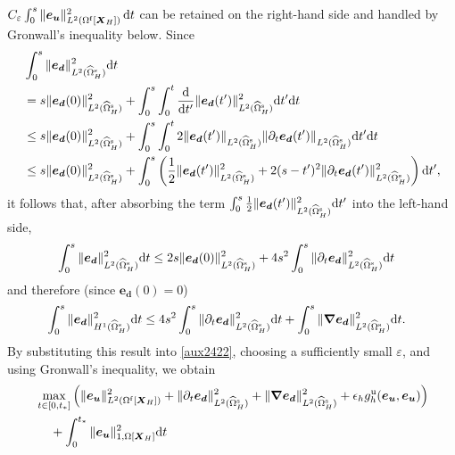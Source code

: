\documentclass[11pt,reqno]{amsart}
\theoremstyle{definition}
\theoremstyle{plain}
\numberwithin{theorem}{section}
\numberwithin{proposition}{section}
\numberwithin{lemma}{section}
\numberwithin{equation}{section}
\newcommand{\bs}[1]{\boldsymbol{#1}}
\newcommand{\uu}[1]  {{\bs{#1}} }
\newcommand{\dep}{{{\bs{d}}}}
\newcommand{\grad}   { \uu{\nabla}    }
\def\d{\mathrm{d}}
\renewcommand{\(}{\bigl(}
\renewcommand{\)}{\bigr)}
\begin{document}
\begin{itemize}[leftmargin=20pt]
$C_\varepsilon\int_0^s\|{\bs e}_{\bs u}\|_{L^2(\Omega^{\rm f}[{\bs X}_H])}^2\,\d t$
can be retained on the right-hand side and handled by Gronwall's inequality below. Since
\begin{align*}
&\int_0^s \|{\bs e}_{\bs d}\|_{L^2(\widehat{\Omega}^{\rm s}_H)}^2 \d t \notag\\
&= s\|{\bs e}_{\bs d}(0)\|_{L^2(\widehat{\Omega}^{\rm s}_H)}^2
+ \int_0^s \int_0^t\frac{\d}{\d t'}\|{\bs e}_{\bs d}(t')\|_{L^2(\widehat{\Omega}^{\rm s}_H)}^2 \d t'\d t  \notag\\
&\le  s\|{\bs e}_{\bs d}(0)\|_{L^2(\widehat{\Omega}^{\rm s}_H)}^2
+ \int_0^s \int_0^t2\|{\bs e}_{\bs d}(t')\|_{L^2(\widehat{\Omega}^{\rm s}_H)}
\|\partial_t{\bs e}_{\bs d}(t')\|_{L^2(\widehat{\Omega}^{\rm s}_H)}  \d t'\d t\notag\\
&\le  s\|{\bs e}_{\bs d}(0)\|_{L^2(\widehat{\Omega}^{\rm s}_H)}^2
+ \int_0^s \left(\frac12\|{\bs e}_{\bs d}(t')\|_{L^2(\widehat{\Omega}^{\rm s}_H)}^2+
2(s-t')^2\|\partial_t{\bs e}_{\bs d}(t')\|_{L^2(\widehat{\Omega}^{\rm s}_H)}^2\right)\d t' , 
\end{align*}
it follows that, after absorbing the term $\int_0^s\frac12\|{\bs e}_{\bs d}(t')\|_{L^2(\widehat{\Omega}^{\rm s}_H)}^2\d t'$ into the left-hand side, 
\begin{align*}
&\int_0^s \|{\bs e}_{\bs d}\|_{L^2(\widehat{\Omega}^{\rm s}_H)}^2 \d t 
\le 2s\|{\bs e}_{\bs d}(0)\|_{L^2(\widehat{\Omega}^{\rm s}_H)}^2
+ 4s^2\int_0^s \|\partial_t{\bs e}_{\bs d}\|_{L^2(\widehat{\Omega}^{\rm s}_H)}^2 \d t 
\end{align*}
and therefore (since ${\bs e}_{\bs d}(0)=0$) 
\begin{align*}
&\int_0^s \|{\bs e}_{\bs d}\|_{H^1(\widehat{\Omega}^{\rm s}_H)}^2 \d t 
\le 4s^2\int_0^s \|\partial_t{\bs e}_{\bs d}\|_{L^2(\widehat{\Omega}^{\rm s}_H)}^2 \d t
+ \int_0^s \|\grad{\bs e}_{\bs d}\|_{L^2(\widehat{\Omega}^{\rm s}_H)}^2 \d t .
\end{align*}
By substituting this result into \eqref{aux2422}, choosing a sufficiently small $\varepsilon$, and using Gronwall's inequality, we obtain 
\begin{align}\label{Bound1}
& \max_{t\in[0,t_*]} \Big(\| {\bs e}_{\bs u} \|_{L^2(\Omega^{\rm f}[\bs X_H])}^2 + \|\partial_t{\bs e}_\dep\|_{L^2(\widehat{\Omega}^{\rm s}_H)}^2 
+ \|\grad {\bs e}_\dep\|_{L^2(\widehat{\Omega}^{\rm s}_H)}^2 
+ \epsilon_h g_h^{\rm u} ({\bs e}_{\bs u}, {\bs e}_{\bs u})  \Big) \notag\\
&\quad\,
+ \int_0^{t_*} \| {\bs e}_{\bs u}\|_{1, \Omega[\bs X_H]}^2 \d t \notag\\

\end{align}
\end{itemize}
\end{document}
